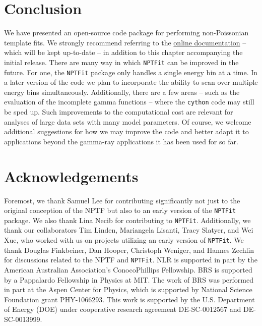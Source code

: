 \section{Conclusion}
\label{Conclusion}

We have presented an open-source code package for performing non-Poissonian template fits.   We strongly recommend referring to the \href{http://nptfit.readthedocs.io}{online documentation} -- which will be kept up-to-date -- in addition to this chapter accompanying the initial release.  There are many way in which \texttt{NPTFit} can be improved in the future.  For one, the  \texttt{NPTFit} package only handles a single energy bin at a time.  In a later version of the code we plan to incorporate the ability to scan over multiple energy bins simultaneously.  Additionally, there are a few areas -- such as the evaluation of the incomplete gamma functions -- where the \texttt{cython} code may still be sped up.  Such improvements to the computational cost are relevant for analyses of large data sets with many model parameters.  Of course, we welcome additional suggestions for how we may improve the code and better adapt it to applications beyond the gamma-ray applications it has been used for so far. 

\section*{Acknowledgements}
\vspace{-10pt}
Foremost, we thank Samuel Lee for contributing significantly not just to the original conception of the NPTF but also to an early version of the \texttt{NPTFit} package.  We also thank Lina Necib for contributing to \texttt{NPTFit}.  Additionally, we thank our collaborators Tim Linden, Mariangela Lisanti, Tracy Slatyer, and Wei Xue, who worked with us on projects utilizing an early version of \texttt{NPTFit}. We thank Douglas Finkbeiner, Dan Hooper, Christoph Weniger, and Hannes Zechlin for discussions related to the NPTF and \texttt{NPTFit}.  NLR is supported in part by the American Australian Association's ConocoPhillips Fellowship. BRS is supported by a Pappalardo Fellowship in Physics at MIT.  The work of BRS was performed in part at the Aspen Center for Physics, which is supported by National Science Foundation grant PHY-1066293. This work is supported by the U.S. Department of Energy (DOE) under cooperative research agreement DE-SC-0012567 and DE-SC-0013999.
